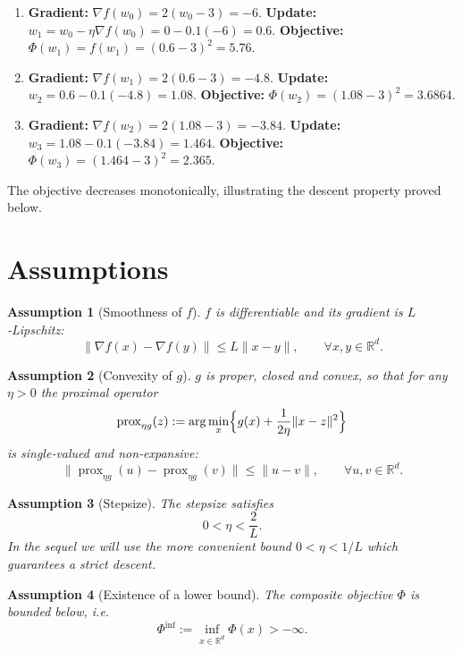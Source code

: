 \documentclass{article}
\newtheorem{assumption}{Assumption}
\newcommand{\prox}{\operatorname{prox}}
\newcommand{\grad}{\nabla}
\newcommand{\R}{\mathbb{R}}
\begin{document}
\begin{enumerate}[label=\textbf{Iter \arabic*:},leftmargin=*]
\item \textbf{Gradient:} $\grad f(w_{0})=2(w_{0}-3)=-6$.
\newline
\textbf{Update:} $w_{1}=w_{0}-\eta\grad f(w_{0})=0-0.1(-6)=0.6$.
\newline
\textbf{Objective:} $\Phi(w_{1})=f(w_{1})=(0.6-3)^{2}=5.76$.
\item \textbf{Gradient:} $\grad f(w_{1})=2(0.6-3)=-4.8$.
\newline
\textbf{Update:} $w_{2}=0.6-0.1(-4.8)=1.08$.
\newline
\textbf{Objective:} $\Phi(w_{2})=(1.08-3)^{2}=3.6864$.
\item \textbf{Gradient:} $\grad f(w_{2})=2(1.08-3)=-3.84$.
\newline
\textbf{Update:} $w_{3}=1.08-0.1(-3.84)=1.464$.
\newline
\textbf{Objective:} $\Phi(w_{3})=(1.464-3)^{2}=2.365$.
\end{enumerate}
The objective decreases monotonically, illustrating the descent property proved below.

\newpage
\section*{Assumptions}
\begin{assumption}[Smoothness of $f$]\label{as:smooth}
$f$ is differentiable and its gradient is $L$‑Lipschitz:
\[
\|\grad f(x)-\grad f(y)\|\le L\|x-y\|,\qquad\forall x,y\in\R^{d}.
\]
\end{assumption}
\begin{assumption}[Convexity of $g$]\label{as:convex}
$g$ is proper, closed and convex, so that for any $\eta>0$ the proximal operator
\[
\prox_{\eta g}(z):=\arg\min_{x}\Bigl\{g(x)+\frac{1}{2\eta}\|x-z\|^{2}\Bigr\}
\]
is single‑valued and \emph{non‑expansive}:
\[
\|\prox_{\eta g}(u)-\prox_{\eta g}(v)\|\le\|u-v\|,\qquad\forall u,v\in\R^{d}.
\tag{2}
\]
\end{assumption}
\begin{assumption}[Stepsize]\label{as:stepsize}
The stepsize satisfies
\[
0<\eta<\frac{2}{L}.
\]
In the sequel we will use the more convenient bound $0<\eta<1/L$ which guarantees a strict descent.
\end{assumption}
\begin{assumption}[Existence of a lower bound]\label{as:bound}
The composite objective $\Phi$ is bounded below, i.e.
\[
\Phi^{\inf}:=\inf_{x\in\R^{d}}\Phi(x)>-\infty .
\]
\end{assumption}
\end{document}
